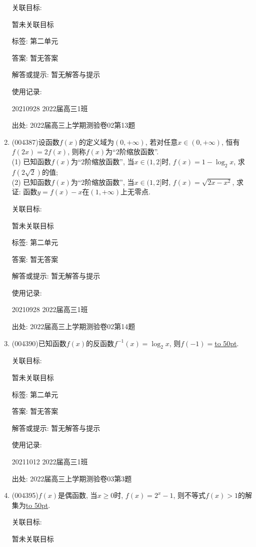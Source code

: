 \documentclass[10pt,a4paper]{article}
\newcommand{\blank}[1]{\underline{\hbox to #1pt{}}}
\begin{document}
\begin{enumerate}[1.]
关联目标:

暂未关联目标



标签: 第二单元

答案: 暂无答案

解答或提示: 暂无解答与提示

使用记录:

20210928	2022届高三1班		


出处: 2022届高三上学期测验卷02第13题
\item { (004387)}设函数$f(x)$的定义域为$(0,+\infty)$, 若对任意$x\in (0,+\infty)$, 恒有$f(2x)=2f(x)$, 则称$f(x)$为``$2$阶缩放函数''.\\
(1) 已知函数$f(x)$为``$2$阶缩放函数'', 当$x\in (1,2]$时, $f(x)=1-\log_2 x$, 求$f(2\sqrt{2})$的值;\\
(2) 已知函数$f(x)$为``$2$阶缩放函数'', 当$x\in (1,2]$时, $f(x)=\sqrt{2x-x^2}$, 求证: 函数$y=f(x)-x$在$(1,+\infty)$上无零点.


关联目标:

暂未关联目标



标签: 第二单元

答案: 暂无答案

解答或提示: 暂无解答与提示

使用记录:

20210928	2022届高三1班		


出处: 2022届高三上学期测验卷02第14题
\item { (004390)}已知函数$f(x)$的反函数$f^{-1}(x)=\log_2x$, 则$f(-1)=$\blank{50}.


关联目标:

暂未关联目标



标签: 第二单元

答案: 暂无答案

解答或提示: 暂无解答与提示

使用记录:

20211012	2022届高三1班	


出处: 2022届高三上学期测验卷03第3题
\item { (004395)}$f(x)$是偶函数, 当$x\ge 0$时, $f(x)=2^x-1$, 则不等式$f(x)>1$的解集为\blank{50}.


关联目标:

暂未关联目标




\end{enumerate}
\end{document}
